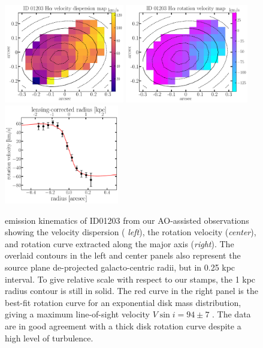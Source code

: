 \begin{figure}
    \centering
    \includegraphics[height=1.7in]{fig/dispersion_ID01203.pdf}
    \includegraphics[height=1.7in]{fig/rotation_ID01203.pdf}
    \includegraphics[height=1.7in]{fig/rotcurve_ID01203.pdf}
    \caption[\Ha emission kinematics of ID01203 from our \osiris AO-assisted observations.]
    {\Ha emission kinematics of ID01203 from our \osiris AO-assisted observations showing the velocity 
    dispersion ({\it
    left}), the rotation velocity ({\it center}), and rotation curve extracted along the major axis ({\it right}).
    The overlaid contours in the left and center panels also represent the source plane de-projected galacto-centric radii, but in
    0.25 kpc interval. To give relative scale with respect to our \hst stamps, the 1 kpc radius contour is still in solid.
    The red curve in the right panel is the best-fit rotation curve for an exponential disk mass distribution, giving a maximum
    line-of-sight velocity $V\sin i = 94 \pm 7$ \kms.
    The data are in good agreement with a thick disk rotation curve despite a high level of turbulence.
    \label{fig:kinem}}
\end{figure}

